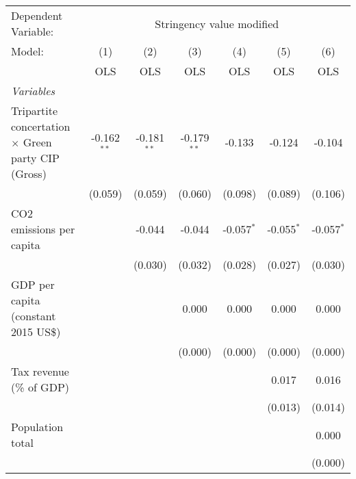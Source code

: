 
\begingroup
\centering
\begin{tabular}{lcccccc}
   \toprule
   Dependent Variable: & \multicolumn{6}{c}{Stringency value modified}\\
   Model:                                                    & (1)           & (2)           & (3)           & (4)          & (5)          & (6)\\  
                                                             &  OLS          & OLS           & OLS           & OLS          & OLS          & OLS\\  
   \midrule
   \emph{Variables}\\
   Tripartite concertation $\times$ Green party CIP (Gross)  & -0.162$^{**}$ & -0.181$^{**}$ & -0.179$^{**}$ & -0.133       & -0.124       & -0.104\\   
                                                             & (0.059)       & (0.059)       & (0.060)       & (0.098)      & (0.089)      & (0.106)\\   
   CO2 emissions per capita                                  &               & -0.044        & -0.044        & -0.057$^{*}$ & -0.055$^{*}$ & -0.057$^{*}$\\   
                                                             &               & (0.030)       & (0.032)       & (0.028)      & (0.027)      & (0.030)\\   
   GDP per capita (constant 2015 US\$)                       &               &               & 0.000         & 0.000        & 0.000        & 0.000\\   
                                                             &               &               & (0.000)       & (0.000)      & (0.000)      & (0.000)\\   
   Tax revenue (\% of GDP)                                   &               &               &               &              & 0.017        & 0.016\\   
                                                             &               &               &               &              & (0.013)      & (0.014)\\   
   Population total                                          &               &               &               &              &              & 0.000\\   
                                                             &               &               &               &              &              & (0.000)\\   

\end{tabular}
